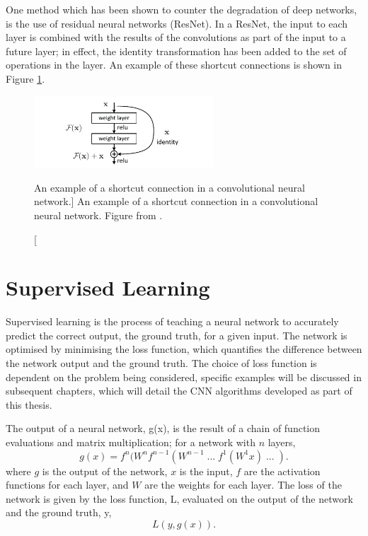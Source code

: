 One method which has been shown to counter the degradation of deep networks, 
is the use of residual neural networks (ResNet). In a ResNet, the input to 
each layer is combined with the results of the convolutions as part of the 
input to a future layer; in effect, the identity transformation has been added
to the set of operations in the layer. An example of these shortcut connections 
is shown in Figure \ref{fig:short_connect}\cite{He_2016_CVPR}. 
\begin{figure}
	\centering
	\includegraphics[width = 0.6\textwidth]{figures/short_connect.pdf}
	\caption
	[An example of a shortcut connection in a convolutional neural network.]
	{An example of a shortcut connection in a convolutional neural network.
	Figure from \cite{He_2016_CVPR}.}
	\label{fig:short_connect}
\end{figure}

\section{Supervised Learning}
Supervised learning is the process of teaching a neural network to accurately
predict the correct output, the ground truth, for a given input. The network is 
optimised by minimising the loss function, which quantifies the difference 
between the network output and the ground truth. The choice of loss function 
is dependent on the problem being considered, specific examples will be 
discussed in subsequent chapters, which will detail the CNN algorithms 
developed as part of this thesis.

The output of a neural network, g(x), is the result of a chain of function 
evaluations and matrix multiplication; for a network with $n$ layers,
\begin{equation*}
	g(x) = f^n(W^n f^{n-1}(W^{n-1} \;...\; f^1(W^1 x) \;...\; ).
\end{equation*}
where $g$ is the output of the network, $x$ is the input, $f$ are the 
activation functions for each layer, and $W$ are the weights for each layer. 
The loss of the network is given by the loss function, L,  evaluated on the 
output of the network and the ground truth, y,
\begin{equation*}
	L(y, g(x)).
\end{equation*}

